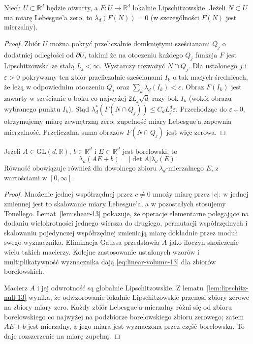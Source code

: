 \begin{lemat}
\label{lem:lipschitz-null-13}
Niech $U\subset\mathbb R^d$ będzie otwarty, a
$F:U\to\mathbb R^d$ lokalnie Lipschitzowskie.
Jeżeli $N\subset U$ ma miarę Lebesgue'a zero, to
$\lambda_d(F(N))=0$ (w szczególności $F(N)$ jest mierzalny).
\end{lemat}
\begin{proof}
Zbiór $U$ można pokryć przeliczalnie domkniętymi sześcianami
$Q_j$ o dodatniej odległości od $\partial U$, takimi że
na otoczeniu każdego $Q_j$ funkcja $F$ jest Lipschitzowska
ze stałą $L_j<\infty$. Wystarczy rozważyć $N\cap Q_j$.
Dla ustalonego $j$ i $\varepsilon>0$ pokrywamy ten zbiór
przeliczalnie sześcianami $I_k$ o tak małych średnicach,
że leżą w odpowiednim otoczeniu $Q_j$ oraz
$\sum_k\lambda_d(I_k)<\varepsilon$.
Obraz $F(I_k)$ jest zawarty w sześcianie o boku
co najwyżej $2L_j\sqrt d$ razy bok $I_k$ (wokół
obrazu wybranego punktu $I_k$). Stąd
$\lambda_d^*(F(N\cap Q_j))\le C_d L_j^d\varepsilon$.
Przechodząc do $\varepsilon\downarrow0$, otrzymujemy
miarę zewnętrzną zero; zupełność miary Lebesgue'a
zapewnia mierzalność. Przeliczalna suma obrazów
$F(N\cap Q_j)$ jest więc zerowa.
\end{proof}

\begin{twierdzenie}
\label{thm:linear-change-13}
Jeżeli $A\in\mathrm{GL}(d,\mathbb R)$, $b\in\mathbb R^d$
i $E\subset\mathbb R^d$ jest borelowski, to
\begin{equation}\label{eq:linear-volume-13}
\lambda_d(AE+b)=|\det A|\lambda_d(E).
\end{equation}
Równość obowiązuje również dla dowolnego zbioru
$\lambda_d$-mierzalnego $E$, z wartościami w $[0,\infty]$.
\end{twierdzenie}
\begin{proof}
Mnożenie jednej współrzędnej przez $c\ne0$ mnoży miarę
przez $|c|$: w jednej zmiennej jest to skalowanie miary
Lebesgue'a, a w pozostałych stosujemy Tonellego.
Lemat~\ref{lem:shear-13} pokazuje, że operacje elementarne
polegające na dodaniu wielokrotności jednego wiersza do drugiego,
permutacji współrzędnych i skalowaniu pojedynczej współrzędnej
zmieniają miarę dokładnie przez moduł swego wyznacznika.
Eliminacja Gaussa przedstawia $A$ jako iloczyn skończenie
wielu takich macierzy. Kolejne zastosowanie ustalonych wzorów
i multiplikatywność wyznacznika dają \eqref{eq:linear-volume-13}
dla zbiorów borelowskich.

Macierz $A$ i jej odwrotność są globalnie Lipschitzowskie.
Z lematu~\ref{lem:lipschitz-null-13} wynika, że odwzorowanie lokalnie
Lipschitzowskie przenosi zbiory zerowe na zbiory miary zero.
Każdy zbiór Lebesgue'a-mierzalny różni się od zbioru borelowskiego
co najwyżej na podzbiorze borelowskiego zbioru zerowego;
zatem $AE+b$ jest mierzalny, a jego miara jest wyznaczona
przez część borelowską. To daje rozszerzenie na miarę zupełną.
\end{proof}

